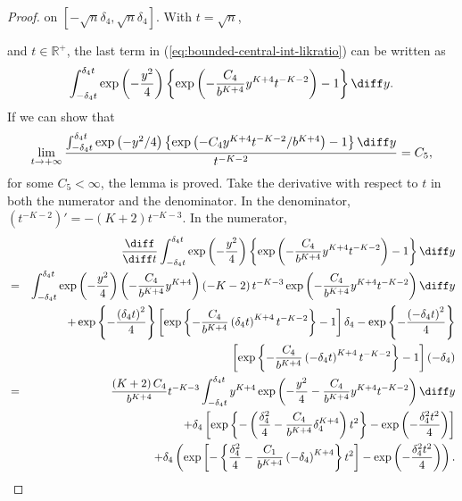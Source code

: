 \begin{proof}
on $\left[-\sqrt{n}\delta_{4},\sqrt{n}\delta_{4}\right]$. With $t=\sqrt{n}$,%
\begin{comment}
unique the introduction of y
\end{comment}
{} and $t\in\mathbb{R}^{+}$, the last term in (\ref{eq:bounded-central-int-likratio})
can be written as 
\[
\int_{-\delta_{4}t}^{\delta_{4}t}\exp\left(-\frac{y^{2}}{4}\right)\left\{ \exp\left(-\frac{C_{4}}{b^{K+4}}y^{K+4}t^{-K-2}\right)-1\right\} \diff y.
\]
If we can show that 
\[
\lim_{t\rightarrow+\infty}\frac{\int_{-\delta_{4}t}^{\delta_{4}t}\exp\left(-y^{2}/4\right)\left\{ \exp\left(-C_{4}y^{K+4}t^{-K-2}/b^{K+4}\right)-1\right\} \diff y}{t^{-K-2}}=C_{5},
\]
for some $C_{5}<\infty$, the lemma is proved. Take the derivative
with respect to $t$ in both the numerator and the denominator. In the denominator,
$\left(t^{-K-2}\right)'=-\left(K+2\right)t^{-K-3}.$ In the numerator,
\begin{eqnarray}
 &  & \frac{\diff}{\diff t}\int_{-\delta_{4}t}^{\delta_{4}t}\exp\left(-\frac{y^{2}}{4}\right)\left\{ \exp\left(-\frac{C_{4}}{b^{K+4}}y^{K+4}t^{-K-2}\right)-1\right\} \diff y\nonumber \\
 & = & \int_{-\delta_{4}t}^{\delta_{4}t}\exp\left(-\frac{y^{2}}{4}\right)\left(-\frac{C_{4}}{b^{K+4}}y^{K+4}\right)\left(-K-2\right)t^{-K-3}\exp\left(-\frac{C_{4}}{b^{K+4}}y^{K+4}t^{-K-2}\right)\diff y\nonumber \\
 &  & +\exp\left\{ -\frac{\left(\delta_{4}t\right)^{2}}{4}\right\} \left[\exp\left\{ -\frac{C_{4}}{b^{K+4}}\left(\delta_{4}t\right)^{K+4}t^{-K-2}\right\} -1\right]\delta_{4}-\exp\left\{ -\frac{\left(-\delta_{4}t\right)^{2}}{4}\right\} \nonumber \\
 &  & \left[\exp\left\{ -\frac{C_{4}}{b^{K+4}}\left(-\delta_{4}t\right)^{K+4}t^{-K-2}\right\} -1\right]\left(-\delta_{4}\right)\nonumber \\
 & = & \frac{\left(K+2\right)C_{4}}{b^{K+4}}t^{-K-3}\int_{-\delta_{4}t}^{\delta_{4}t}y^{K+4}\exp\left(-\frac{y^{2}}{4}-\frac{C_{4}}{b^{K+4}}y^{K+4}t^{-K-2}\right)\diff y\nonumber \\
 &  & +\delta_{4}\left[\exp\left\{ -\left(\frac{\delta_{4}^{2}}{4}-\frac{C_{4}}{b^{K+4}}\delta_{4}^{K+4}\right)t^{2}\right\} -\exp\left(-\frac{\delta_{4}^{2}t^{2}}{4}\right)\right]\label{eq:lhospital-diff-numerator}\\
 &  & +\delta_{4}\left(\exp\left[-\left\{ \frac{\delta_{4}^{2}}{4}-\frac{C_{1}}{b^{K+4}}\left(-\delta_{4}\right)^{K+4}\right\} t^{2}\right]-\exp\left(-\frac{\delta_{4}^{2}t^{2}}{4}\right)\right).\nonumber 
\end{eqnarray}

\end{proof}
